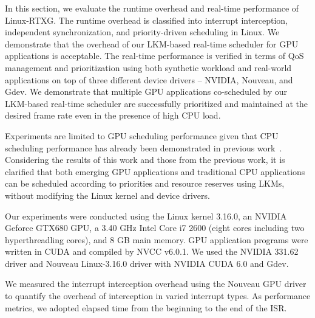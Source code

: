 \label{sec:evaluation}
In this section, we evaluate the runtime overhead and real-time
performance of Linux-RTXG.
The runtime overhead is classified into interrupt interception,
independent synchronization, and priority-driven scheduling in Linux.
We demonstrate that the overhead of our LKM-based real-time scheduler
for GPU applications is acceptable.
The real-time performance is verified in terms of QoS management and
prioritization using both synthetic workload and real-world
applications on top of three different device drivers -- NVIDIA,
Nouveau, and Gdev.
We demonstrate that multiple GPU applications co-scheduled by our
LKM-based real-time scheduler are successfully prioritized and
maintained at the desired frame rate even in the presence of high CPU
load.

Experiments are limited to GPU scheduling performance given that CPU
scheduling performance has already been demonstrated in previous
work~\cite{kato2009loadable}.
Considering the results of this work and those from the previous work,
it is clarified that both emerging GPU applications and traditional CPU
applications can be scheduled according to priorities and resource
reserves using LKMs, without modifying the Linux kernel and device
drivers.

Our experiments were conducted using the Linux kernel 3.16.0, an NVIDIA
Geforce GTX680 GPU, a 3.40 GHz Intel Core i7 2600 (eight cores including
two hyperthreadling cores), and 8 GB main memory.  
GPU application programs were written in CUDA and compiled by NVCC v6.0.1.
We used the NVIDIA 331.62 driver and Nouveau Linux-3.16.0 driver with
NVIDIA CUDA 6.0 and Gdev. 

We measured the interrupt interception overhead using the Nouveau GPU
driver to quantify the overhead of interception in varied interrupt
types. 
As performance metrics, we adopted elapsed time from the beginning to
the end of the ISR.

